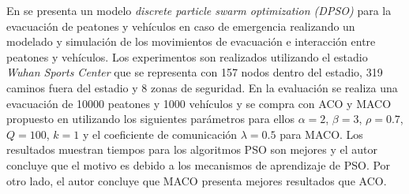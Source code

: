 En \cite{zong2014conflict} se presenta un modelo \textit{discrete particle swarm optimization (DPSO)} para la evacuación de peatones y vehículos en caso de emergencia realizando un modelado y simulación de los movimientos de evacuación e interacción entre peatones y vehículos.  Los experimentos son realizados utilizando el estadio \textit{Wuhan Sports Center} que se representa con 157 nodos dentro del estadio, 319 caminos fuera del estadio y 8 zonas de seguridad. En la evaluación se realiza una evacuación de 10000 peatones y 1000 vehículos y se compra con ACO y MACO propuesto en \cite{zong2010multi,zong2010multiflow} utilizando los siguientes parámetros para ellos $\alpha=2$, $\beta=3$, $\rho=0.7$, $Q=100$, $k=1$ y el coeficiente de comunicación $\lambda=0.5$ para MACO. Los resultados muestran tiempos para los algoritmos PSO son mejores y el autor concluye que el motivo es debido a los mecanismos de aprendizaje de PSO. Por otro lado, el autor concluye que MACO presenta mejores resultados que ACO.

